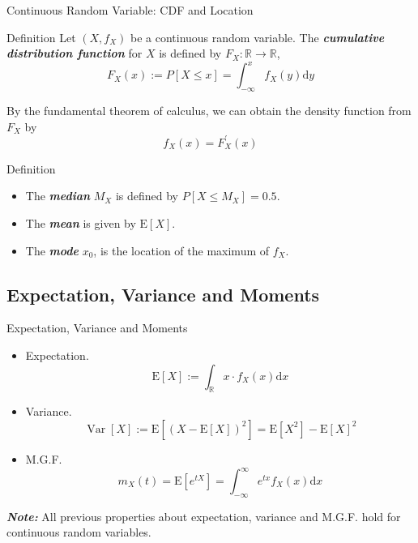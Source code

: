 \documentclass{beamer}
\newcommand{\bb}[1]{\textcolor{antiquefuchsia}{\textbf{\textit{#1}}}}
\begin{document}
\begin{frame}{Continuous Random Variable: CDF and Location}
\begin{block}{Definition}
Let $\left(X, f_{X}\right)$ be a continuous random variable. The \bb{cumulative distribution function} for $X$ is defined by $F_{X}: \mathbb{R} \rightarrow \mathbb{R}$,
$$
F_{X}(x):=P[X \leq x]=\int_{-\infty}^{x} f_{X}(y) \mathrm{d} y
$$
\end{block}
By the fundamental theorem of calculus, we can obtain the density function from $F_{X}$ by
$$
f_{X}(x)=F_{X}^{\prime}(x)
$$
\begin{block}{Definition}
\begin{itemize}
\item The \bb{median} $M_{X}$ is defined by $P\left[X \leq M_{X}\right]=0.5$.
\item The \bb{mean} is given by $\mathrm{E}[X]$.
\item The \bb{mode} $x_{0}$, is the location of the maximum of $f_{X}$.
\end{itemize}
\end{block}
\end{frame}
\subsection{Expectation, Variance and Moments}
\begin{frame}{Expectation, Variance and Moments}
\begin{itemize}
\item Expectation.
$$
\mathrm{E}[X]:=\int_{\mathbb{R}} x \cdot f_{X}(x) \mathrm{d} x
$$
\item Variance.
$$
\operatorname{Var}[X]:=\mathrm{E}\left[(X-\mathrm{E}[X])^{2}\right]=\mathrm{E}\left[X^{2}\right]-\mathrm{E}[X]^{2}
$$
\item M.G.F.
$$
m_{X}(t)=\mathrm{E}\left[e^{t X}\right]=\int_{-\infty}^{\infty} e^{t x} f_{X}(x) \mathrm{d} x
$$
\end{itemize}
\bb{Note:} All previous properties about expectation, variance and M.G.F. hold
for continuous random variables.
\end{frame}
\end{document}
